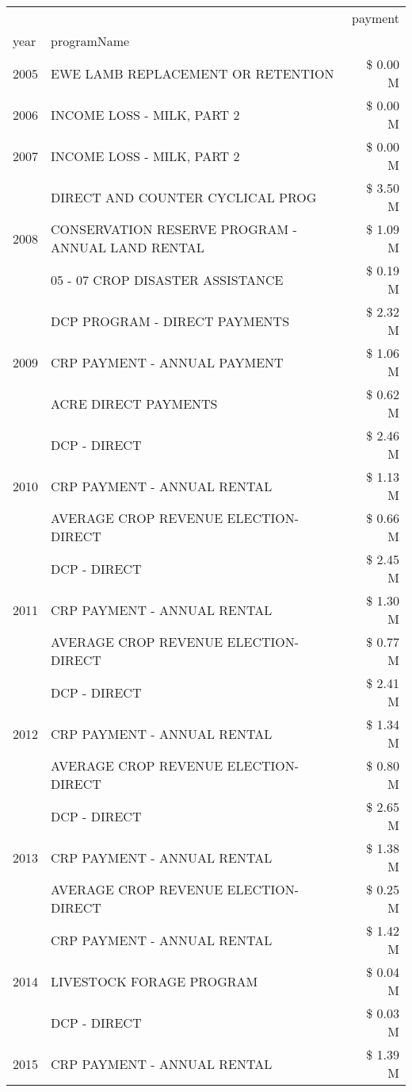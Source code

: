 \begin{tabular}{llr}
\toprule
 &  & payment \\
year & programName &  \\
\midrule
2005 & EWE LAMB REPLACEMENT OR RETENTION & \$ 0.00 M \\
\cline{1-3}
2006 & INCOME LOSS - MILK, PART 2 & \$ 0.00 M \\
\cline{1-3}
2007 & INCOME LOSS - MILK, PART 2 & \$ 0.00 M \\
\cline{1-3}
\multirow[t]{3}{*}{2008} & DIRECT AND COUNTER CYCLICAL PROG & \$ 3.50 M \\
 & CONSERVATION RESERVE PROGRAM - ANNUAL LAND RENTAL & \$ 1.09 M \\
 & 05 - 07 CROP DISASTER ASSISTANCE & \$ 0.19 M \\
\cline{1-3}
\multirow[t]{3}{*}{2009} & DCP PROGRAM - DIRECT PAYMENTS & \$ 2.32 M \\
 & CRP PAYMENT - ANNUAL PAYMENT & \$ 1.06 M \\
 & ACRE DIRECT PAYMENTS & \$ 0.62 M \\
\cline{1-3}
\multirow[t]{3}{*}{2010} & DCP - DIRECT & \$ 2.46 M \\
 & CRP PAYMENT - ANNUAL RENTAL & \$ 1.13 M \\
 & AVERAGE CROP REVENUE ELECTION-DIRECT & \$ 0.66 M \\
\cline{1-3}
\multirow[t]{3}{*}{2011} & DCP - DIRECT & \$ 2.45 M \\
 & CRP PAYMENT - ANNUAL RENTAL & \$ 1.30 M \\
 & AVERAGE CROP REVENUE ELECTION-DIRECT & \$ 0.77 M \\
\cline{1-3}
\multirow[t]{3}{*}{2012} & DCP - DIRECT & \$ 2.41 M \\
 & CRP PAYMENT - ANNUAL RENTAL & \$ 1.34 M \\
 & AVERAGE CROP REVENUE ELECTION-DIRECT & \$ 0.80 M \\
\cline{1-3}
\multirow[t]{3}{*}{2013} & DCP - DIRECT & \$ 2.65 M \\
 & CRP PAYMENT - ANNUAL RENTAL & \$ 1.38 M \\
 & AVERAGE CROP REVENUE ELECTION-DIRECT & \$ 0.25 M \\
\cline{1-3}
\multirow[t]{3}{*}{2014} & CRP PAYMENT - ANNUAL RENTAL & \$ 1.42 M \\
 & LIVESTOCK FORAGE PROGRAM & \$ 0.04 M \\
 & DCP - DIRECT & \$ 0.03 M \\
\cline{1-3}
\multirow[t]{3}{*}{2015} & CRP PAYMENT - ANNUAL RENTAL & \$ 1.39 M \\

\end{tabular}

